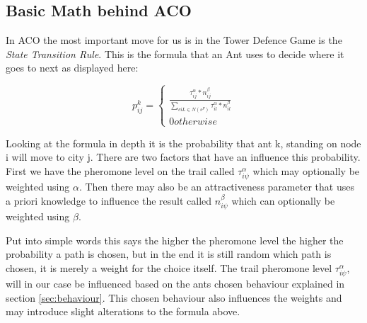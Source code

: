 \subsection{Basic Math behind ACO}

In ACO the most important move for us is in the Tower Defence Game is the \textit{State Transition Rule}. This is the formula that an Ant uses to decide where it goes to next as displayed here\cite{dorigo2006ant}:

\begin{equation}
p^k_{ij}=
\begin{cases}
\frac{\tau^\alpha_{ij}*n^\beta_{ij}}{\sum_{ciL\in N(s^P)}\tau^\alpha_{il}*n^\beta_{il}} \\
0 otherwise
\end{cases}
\end{equation}

Looking at the formula in depth it is the probability that ant k, standing on node i will move to city j\cite{maniezzo2002ant}.
There are two factors that have an influence this probability.
First we have the pheromone level on the trail called $\tau^\alpha_{i\psi}$ which may optionally be weighted using $\alpha$.
Then there may also be an attractiveness parameter that uses a priori knowledge to influence the result called $n^\beta_{i\psi}$ which can optionally be weighted using $\beta$\cite{dorigo2006ant}.

Put into simple words this says the higher the pheromone level the higher the probability a path is chosen, but in the end it is still random which path is chosen, it is merely a weight for the choice itself.
The trail pheromone level $\tau^\alpha_{i\psi}$, will in our case be influenced based on the ants chosen behaviour explained in section \ref{sec:behaviour}. This chosen behaviour also influences the weights and may introduce slight alterations to the formula above.